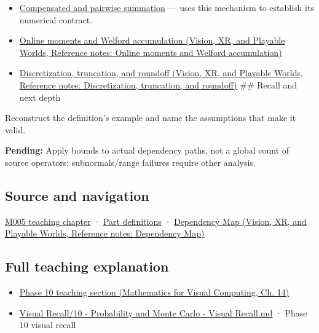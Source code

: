 \hypertarget{appendix-f82e270791c8-used-by}{}

\begin{itemize}
\item
  \hyperref[appendix-df318da57389]{Compensated and pairwise summation} --- uses this mechanism to establish its numerical contract.
\item
  \href{../07-Vision-XR-and-Playable-Worlds/main.pdf\#nameddest=appendix-33237f0f618b}{Online moments and Welford accumulation (Vision, XR, and Playable Worlds, Reference notes: Online moments and Welford accumulation)}
\item
  \href{../07-Vision-XR-and-Playable-Worlds/main.pdf\#nameddest=appendix-6b0648b2b8e8}{Discretization, truncation, and roundoff (Vision, XR, and Playable Worlds, Reference notes: Discretization, truncation, and roundoff)} \#\# Recall and next depth
\end{itemize}

Reconstruct the definition's example and name the assumptions that make it valid.

\textbf{Pending:} Apply bounds to actual dependency paths, not a global count of source operators; subnormals/range failures require other analysis.

\subsection{Source and navigation}\label{appendix-f82e270791c8-source-and-navigation}

\hypertarget{appendix-f82e270791c8-source-and-navigation}{}

\hyperref[01-foundations-i-ch001-when-arithmetic-meets-uncertainty]{M005 teaching chapter} · \hyperref[appendix-fd090d982a15-m005---parts-77-88]{Part definitions} · \href{../07-Vision-XR-and-Playable-Worlds/main.pdf\#nameddest=appendix-4ad47bdd269a}{Dependency Map (Vision, XR, and Playable Worlds, Reference notes: Dependency Map)}

\subsection{Full teaching explanation}\label{appendix-f82e270791c8-full-teaching-explanation}

\hypertarget{appendix-f82e270791c8-full-teaching-explanation}{}

\begin{itemize}
\tightlist
\item
  \href{../02-Mathematics-for-Visual-Computing/main.pdf\#nameddest=02-foundations-ii-ch030-finite-samples-need-stable-descriptive-statistics}{Phase 10 teaching section (Mathematics for Visual Computing, Ch. 14)}
\item
  \hyperref[appendix-cb5af353ef77]{Visual Recall/10 - Probability and Monte Carlo - Visual Recall.md} · Phase 10 visual recall
\end{itemize}
